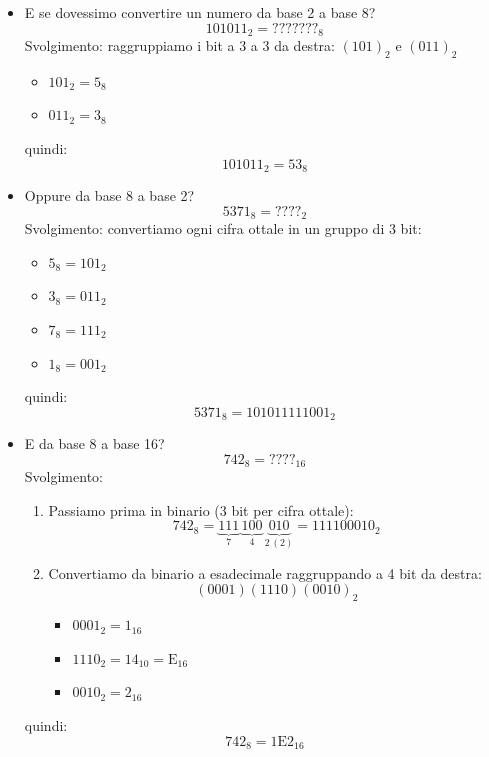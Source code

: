 \begin{itemize}
    \item E se dovessimo convertire un numero da base 2 a base 8?
    \[
        101011_2 = ???????_8
    \]
    Svolgimento: raggruppiamo i bit a 3 a 3 da destra: $(101)_2$ e $(011)_2$
    \begin{itemize}
        \item $101_2 = 5_8$
        \item $011_2 = 3_8$
    \end{itemize}
    quindi:
    \[
        101011_2 = 53_8
    \]

    \vspace{0.3cm}

    \item Oppure da base 8 a base 2?
    \[
        5371_8 = ????_2
    \]
    Svolgimento: convertiamo ogni cifra ottale in un gruppo di 3 bit:
    \begin{itemize}
        \item $5_8 = 101_2$
        \item $3_8 = 011_2$
        \item $7_8 = 111_2$
        \item $1_8 = 001_2$
    \end{itemize}
    quindi:
    \[
        5371_8 = 101011111001_2
    \]

    \vspace{0.3cm}

    \item E da base 8 a base 16?
    \[
        742_8 = ????_{16}
    \]
    Svolgimento: 
    \begin{enumerate}
        \item Passiamo prima in binario (3 bit per cifra ottale):
        \[
            742_8 = \underbrace{111}_{7}\,\underbrace{100}_{4}\,\underbrace{010}_{2\,(2)} = 111100010_2
        \]
        \item Convertiamo da binario a esadecimale raggruppando a 4 bit da destra:
        \[
            (0001)(1110)(0010)_2
        \]
        \begin{itemize}
            \item $0001_2 = 1_{16}$
            \item $1110_2 = 14_{10} = \text{E}_{16}$
            \item $0010_2 = 2_{16}$
        \end{itemize}
    \end{enumerate}
    quindi:
    \[
        742_8 = 1\text{E}2_{16}
    \]
\end{itemize}

